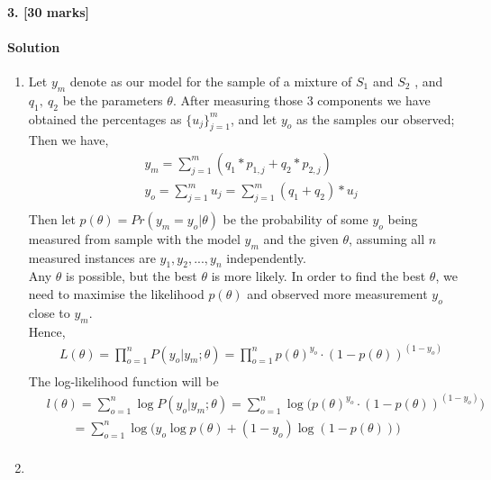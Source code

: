 \documentclass[a4paper]{scrartcl}
\begin{document}
\paragraph{3. [30 marks]}
\label{sec:Question 3}
\paragraph{Solution}
\begin{enumerate}[label=(\arabic*)]
  \item
  Let $y_m$ denote as our model for the sample of a mixture of $S_1$ and $S_2$ , and $q_1,\ q_2$ be the parameters $\theta$. After measuring those 3 components we have obtained the percentages as ${\{u_j\}_{j=1}^{m}}$, and let  $y_o$ as the samples our observed;
  Then we have,
  \begin{align*}
    &\ y_m = \sum_{j=1}^{m} (q_1* p_{1,j} + q_2* p_{2,j})\\ &\
     y_o = \sum_{j=1}^{m} u_j = \sum_{j=1}^{m} (q_1+q_2)*u_j\\ &\
  \end{align*}
  Then let $p(\theta)=Pr(y_m=y_o|\theta)$ be the probability of some $y_o$ being measured from sample with the model $y_m$ and the given $\theta$, assuming all $n$ measured instances are $y_1,y_2,...,y_n$ independently. \\
  Any $\theta$ is possible, but the best $\theta$ is more likely. In order to find the best $\theta$, we need to maximise the likelihood $p(\theta)$ and observed more measurement $y_o$ close to $y_m$.\\Hence,
  \begin{align*}
   &\ L(\theta)=\prod_{o=1}^{n}P(y_o|y_m;\theta)=\prod_{o=1}^{n}p(\theta)^{y_o} \cdot (1-p(\theta))^{(1-y_o)} \\ &\
  \end{align*}
  The log-likelihood function will be\\
  \begin{align*}
   &\ l(\theta)=\sum_{o=1}^{n}\log{P(y_o|y_m;\theta)}=\sum_{o=1}^{n}\log{\bigg(p(\theta)^{y_o} \cdot (1-p(\theta))^{(1-y_o)}\bigg)}\\ 
   &\ \qquad=\sum_{o=1}^{n}\log{\bigg(y_o\log{p(\theta)} +(1-y_o) \log{(1-p(\theta))}\bigg)}\\ &\
  \end{align*}
  \item
\end{enumerate}
\end{document}
